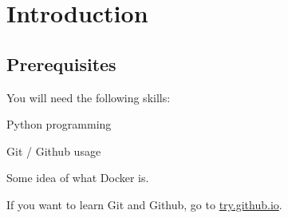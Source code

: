 \section{Introduction}

\subsection{Prerequisites}

You will need the following skills:

\begin{compactitem}
  \item Python programming
  \item Git / Github usage
  \item Some idea of what Docker is.
\end{compactitem}


If you want to learn Git and Github, go to \href{https://try.github.io/}{try.github.io}.


